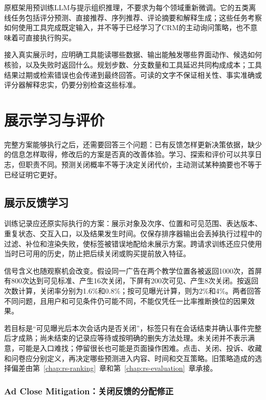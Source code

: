 原框架用预训练LLM与提示组织推理，不要求为每个领域重新微调。它的五类离线任务包括评分预测、直接推荐、序列推荐、评论摘要和解释生成；这些任务考察如何使用工具完成既定输入，并不等于已经学习了CRM的主动询问策略，也不意味着可直接执行购买。

接入真实展示时，应明确工具能读哪些数据、输出能触发哪些界面动作、候选如何核验，以及失败时返回什么。规划步数、分支数量和工具延迟共同构成成本；工具结果过期或检索错误也会传递到最终回答。可读的文字不保证相关性、事实准确或评分器解释忠实，仍要分别检查这些标准。

\section{展示学习与评价}
\label{sec:rs-presentation-learning}

完整方案能够执行之后，还需要回答三个问题：已有反馈怎样更新决策依据，缺少的信息怎样取得，修改后的方案是否真的改善体验。学习、探索和评价可以共享日志，但职责不同。预测关闭概率不等于决定关闭代价，主动测试某种摘要也不等于已经证明它更好。

\subsection{展示反馈学习}
\label{sec:rs-display-feedback}

训练记录应还原实际执行的方案：展示对象及次序、位置和可见范围、表达版本、重复状态、交互入口，以及结果发生时间。仅保存排序器输出会丢掉执行过程中的过滤、补位和渲染失败，使标签被错误地配给未展示方案。跨请求训练还应只使用当时已可用的历史，防止把后续关闭或购买提前放入特征。

信号含义也随观察机会改变。假设同一广告在两个教学位置各被返回1000次，首屏有800次达到可见标准、产生16次关闭，下屏有200次可见、产生8次关闭。按返回次数计算，关闭率分别为1.6\%和0.8\%；按可见曝光计算，则为2\%和4\%。两者回答不同问题，且用户和可见条件仍可能不同，不能仅凭任一比率推断换位的因果效果。

若目标是“可见曝光后本次会话内是否关闭”，标签只有在会话结束并确认事件完整后才成熟；尚未结束的记录应等待或按明确的删失方法处理。未关闭并不表示满意，可能是入口难找；停留很长也可能是页面操作困难。点击、关闭、投诉、收藏和问卷应分别定义，再决定哪些预测进入内容、时间和交互策略。旧策略造成的选择偏差由第~\ref{chap:rs-ranking}~章和第~\ref{chap:rs-evaluation}~章承接。

\Needspace{85mm}
\subsubsection{Ad Close Mitigation：关闭反馈的分配修正}
\label{sec:rs-ad-close}

